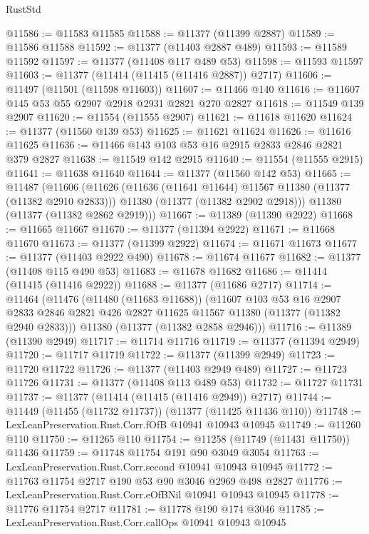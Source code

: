 \begin{lexlean}{RustStd}
\begin{coremodule}
@11586 := @11583 @11585
@11588 := @11377 (@11399 @2887)
@11589 := @11586 @11588
@11592 := @11377 (@11403 @2887 @489)
@11593 := @11589 @11592
@11597 := @11377 (@11408 @117 @489 @53)
@11598 := @11593 @11597
@11603 := @11377 (@11414 (@11415 (@11416 @2887)) @2717)
@11606 := @11497 (@11501 (@11598 @11603))
@11607 := @11466 @140
@11616 := @11607 @145 @53 @55 @2907 @2918 @2931 @2821 @270 @2827
@11618 := @11549 @139 @2907
@11620 := @11554 (@11555 @2907)
@11621 := @11618 @11620
@11624 := @11377 (@11560 @139 @53)
@11625 := @11621 @11624
@11626 := @11616 @11625
@11636 := @11466 @143 @103 @53 @16 @2915 @2833 @2846 @2821 @379 @2827
@11638 := @11549 @142 @2915
@11640 := @11554 (@11555 @2915)
@11641 := @11638 @11640
@11644 := @11377 (@11560 @142 @53)
@11665 := @11487
    (@11606
      (@11626
        (@11636 (@11641 @11644) @11567 @11380 (@11377 (@11382 @2910 @2833)))
        @11380
        (@11377 (@11382 @2902 @2918)))
      @11380
      (@11377 (@11382 @2862 @2919)))
@11667 := @11389 (@11390 @2922)
@11668 := @11665 @11667
@11670 := @11377 (@11394 @2922)
@11671 := @11668 @11670
@11673 := @11377 (@11399 @2922)
@11674 := @11671 @11673
@11677 := @11377 (@11403 @2922 @490)
@11678 := @11674 @11677
@11682 := @11377 (@11408 @115 @490 @53)
@11683 := @11678 @11682
@11686 := @11414 (@11415 (@11416 @2922))
@11688 := @11377 (@11686 @2717)
@11714 := @11464
    (@11476
      (@11480 (@11683 @11688))
      (@11607
        @103
        @53
        @16
        @2907
        @2833
        @2846
        @2821
        @426
        @2827
        @11625
        @11567
        @11380
        (@11377 (@11382 @2940 @2833)))
      @11380
      (@11377 (@11382 @2858 @2946)))
@11716 := @11389 (@11390 @2949)
@11717 := @11714 @11716
@11719 := @11377 (@11394 @2949)
@11720 := @11717 @11719
@11722 := @11377 (@11399 @2949)
@11723 := @11720 @11722
@11726 := @11377 (@11403 @2949 @489)
@11727 := @11723 @11726
@11731 := @11377 (@11408 @113 @489 @53)
@11732 := @11727 @11731
@11737 := @11377 (@11414 (@11415 (@11416 @2949)) @2717)
@11744 := @11449 (@11455 (@11732 @11737)) (@11377 (@11425 @11436 @110))
@11748 := LexLeanPreservation.Rust.Corr.fOfB @10941 @10943 @10945
@11749 := @11260 @110
@11750 := @11265 @110
@11754 := @11258 (@11749 (@11431 @11750)) @11436
@11759 := @11748 @11754 @191 @90 @3049 @3054
@11763 := LexLeanPreservation.Rust.Corr.second @10941 @10943 @10945
@11772 := @11763 @11754 @2717 @190 @53 @90 @3046 @2969 @498 @2827
@11776 := LexLeanPreservation.Rust.Corr.eOfBNil @10941 @10943 @10945
@11778 := @11776 @11754 @2717
@11781 := @11778 @190 @174 @3046
@11785 := LexLeanPreservation.Rust.Corr.callOps @10941 @10943 @10945

\end{coremodule}
\end{lexlean}
